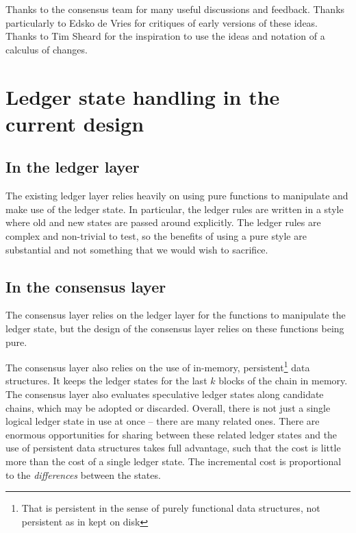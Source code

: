 \documentclass[11pt,a4paper]{article}
\begin{document}
Thanks to the consensus team for many useful discussions and feedback. Thanks
particularly to Edsko de Vries for critiques of early versions of these ideas.
Thanks to Tim Sheard for the inspiration to use the ideas and notation of a
calculus of changes.

\tableofcontents

\section{Ledger state handling in the current design}
\label{ledger-state-handling-in-the-current-design}

\subsection{In the ledger layer}
\label{ledger-state-handling-in-the-current-ledger-layer}

The existing ledger layer relies heavily on using pure functions to manipulate
and make use of the ledger state. In particular, the ledger rules are written in
a style where old and new states are passed around explicitly. The ledger rules
are complex and non-trivial to test, so the benefits of using a pure style are
substantial and not something that we would wish to sacrifice.

\subsection{In the consensus layer}
\label{ledger-state-handling-in-the-current-consensus-layer}

The consensus layer relies on the ledger layer for the functions to manipulate
the ledger state, but the design of the consensus layer relies on these
functions being pure.

The consensus layer also relies on the use of in-memory,
persistent\footnote{That is persistent in the sense of purely functional data
structures, not persistent as in kept on disk} data structures. It keeps the
ledger states for the last $k$ blocks of the chain in memory. The consensus
layer also evaluates speculative ledger states along candidate chains, which may
be adopted or discarded. Overall, there is not just a single logical ledger
state in use at once -- there are many related ones. There are enormous
opportunities for sharing between these related ledger states and the use of
persistent data structures takes full advantage, such that the cost is little
more than the cost of a single ledger state. The incremental cost is
proportional to the \emph{differences} between the states.
\end{document}
